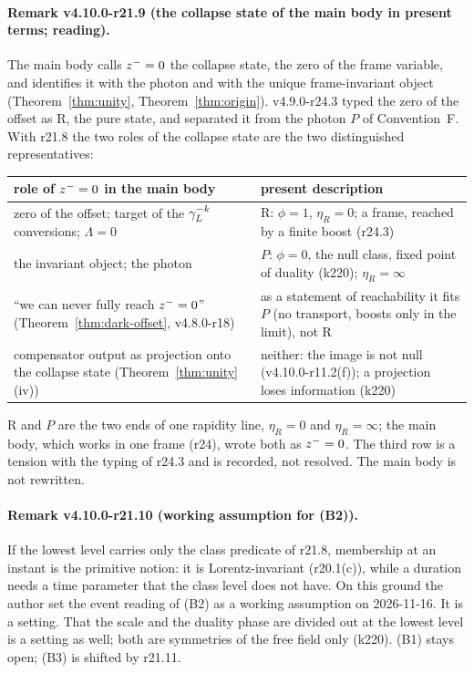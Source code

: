 \paragraph{Remark v4.10.0-r21.9 (the collapse state of the main body in present terms; reading).}
The main body calls \(z^-=0\) the collapse state, the zero of the frame variable, and identifies it with the photon and with the
unique frame-invariant object (Theorem~\ref{thm:unity}, Theorem~\ref{thm:origin}).  v4.9.0-r24.3 typed the zero of the offset as R, the
pure state, and separated it from the photon \(P\) of Convention~F.  With r21.8 the two roles of the collapse state are the two
distinguished representatives:
\begin{center}
\small
\begin{tabular}{@{}>{\raggedright\arraybackslash}p{}>{\raggedright\arraybackslash}p{}@{}}
\toprule
role of \(z^-=0\) in the main body & present description\\
\midrule
zero of the offset; target of the \(\gamma_L^{-k}\) conversions; \(\Lambda=0\) & R: \(\phi=1\), \(\eta_R=0\); a frame, reached by a finite boost (r24.3)\\
the invariant object; the photon & \(P\): \(\phi=0\), the null class, fixed point of duality (k220); \(\eta_R=\infty\)\\
``we can never fully reach \(z^-=0\)'' (Theorem~\ref{thm:dark-offset}, v4.8.0-r18) & as a statement of reachability it fits \(P\) (no transport, boosts only in the limit), not R\\
compensator output as projection onto the collapse state (Theorem~\ref{thm:unity}(iv)) & neither: the image is not null (v4.10.0-r11.2(f)); a projection loses information (k220)\\
\bottomrule
\end{tabular}
\end{center}
R and \(P\) are the two ends of one rapidity line, \(\eta_R=0\) and \(\eta_R=\infty\); the main body, which works in one frame (r24), wrote both
as \(z^-=0\).  The third row is a tension with the typing of r24.3 and is recorded, not resolved.  The main body is not rewritten.

\paragraph{Remark v4.10.0-r21.10 (working assumption for (B2)).}
If the lowest level carries only the class predicate of r21.8, membership at an instant is the primitive notion: it is
Lorentz-invariant (r20.1(c)), while a duration needs a time parameter that the class level does not have.  On this ground the author
set the event reading of (B2) as a working assumption on 2026-11-16.  It is a setting.  That the scale and the duality phase are
divided out at the lowest level is a setting as well; both are symmetries of the free field only (k220).  (B1) stays open; (B3) is
shifted by r21.11.

